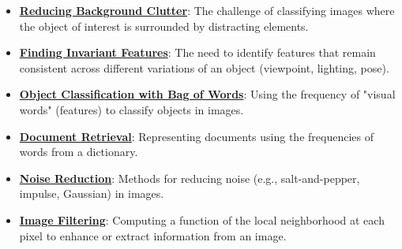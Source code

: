 \documentclass{article}%
\begin{document}
\begin{itemize}[leftmargin=*]
\item \href{https://purdue.brightspace.com/d2l/common/assets/pdfjs-d2l-dist/1.0.14-legacy/web/viewer.html?file=%2Fcontent%2Fenforced%2F1095467-wl.202510.CS.24300.001%2F07L2-Vision.pdf%3Fou%3D1095467&lang=en-us&container=d2l-fileviewer-rendered-pdf&fullscreen=d2l-fileviewer-rendered-pdf-dialog&height=667#page=10}{\textbf{Reducing Background Clutter}}: The challenge of classifying images where the object of interest is surrounded by distracting elements.%
\item \href{https://purdue.brightspace.com/d2l/common/assets/pdfjs-d2l-dist/1.0.14-legacy/web/viewer.html?file=%2Fcontent%2Fenforced%2F1095467-wl.202510.CS.24300.001%2F07L2-Vision.pdf%3Fou%3D1095467&lang=en-us&container=d2l-fileviewer-rendered-pdf&fullscreen=d2l-fileviewer-rendered-pdf-dialog&height=667#page=11}{\textbf{Finding Invariant Features}}: The need to identify features that remain consistent across different variations of an object (viewpoint, lighting, pose).%
\item \href{https://purdue.brightspace.com/d2l/common/assets/pdfjs-d2l-dist/1.0.14-legacy/web/viewer.html?file=%2Fcontent%2Fenforced%2F1095467-wl.202510.CS.24300.001%2F07L2-Vision.pdf%3Fou%3D1095467&lang=en-us&container=d2l-fileviewer-rendered-pdf&fullscreen=d2l-fileviewer-rendered-pdf-dialog&height=667#page=12}{\textbf{Object Classification with Bag of Words}}: Using the frequency of "visual words" (features) to classify objects in images.%
\item \href{https://purdue.brightspace.com/d2l/common/assets/pdfjs-d2l-dist/1.0.14-legacy/web/viewer.html?file=%2Fcontent%2Fenforced%2F1095467-wl.202510.CS.24300.001%2F07L2-Vision.pdf%3Fou%3D1095467&lang=en-us&container=d2l-fileviewer-rendered-pdf&fullscreen=d2l-fileviewer-rendered-pdf-dialog&height=667#page=20}{\textbf{Document Retrieval}}: Representing documents using the frequencies of words from a dictionary.%
\item \href{https://purdue.brightspace.com/d2l/common/assets/pdfjs-d2l-dist/1.0.14-legacy/web/viewer.html?file=%2Fcontent%2Fenforced%2F1095467-wl.202510.CS.24300.001%2F07L2-Vision.pdf%3Fou%3D1095467&lang=en-us&container=d2l-fileviewer-rendered-pdf&fullscreen=d2l-fileviewer-rendered-pdf-dialog&height=667#page=33}{\textbf{Noise Reduction}}: Methods for reducing noise (e.g., salt-and-pepper, impulse, Gaussian) in images.%
\item \href{https://purdue.brightspace.com/d2l/common/assets/pdfjs-d2l-dist/1.0.14-legacy/web/viewer.html?file=%2Fcontent%2Fenforced%2F1095467-wl.202510.CS.24300.001%2F07L2-Vision.pdf%3Fou%3D1095467&lang=en-us&container=d2l-fileviewer-rendered-pdf&fullscreen=d2l-fileviewer-rendered-pdf-dialog&height=667#page=49}{\textbf{Image Filtering}}: Computing a function of the local neighborhood at each pixel to enhance or extract information from an image.%

\end{itemize}
\end{document}
